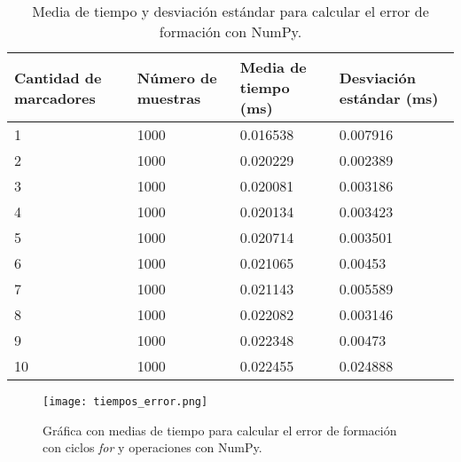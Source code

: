 \begin{table}[H]
	\centering
	\resizebox{\textwidth}{!} {
	\begin{tabular}{|l|l|l|l|}
		\hline
		\textbf{Cantidad de marcadores} & \textbf{Número de muestras} & \textbf{Media de tiempo (ms)} & \textbf{Desviación estándar (ms)} \\ \hline
		1 & 1000 & 0.016538 & 0.007916 \\ \hline
		2 & 1000 & 0.020229 & 0.002389 \\ \hline
		3 & 1000 & 0.020081 & 0.003186 \\ \hline
		4 & 1000 & 0.020134 & 0.003423 \\ \hline
		5 & 1000 & 0.020714 & 0.003501 \\ \hline
		6 & 1000 & 0.021065 & 0.00453 \\ \hline
		7 & 1000 & 0.021143 & 0.005589 \\ \hline
		8 & 1000 & 0.022082 & 0.003146 \\ \hline
		9 & 1000 & 0.022348 & 0.00473 \\ \hline
		10 & 1000 & 0.022455 & 0.024888 \\ \hline
	\end{tabular}}
	\caption{Media de tiempo y desviación estándar para calcular el error de formación con NumPy.}
	\label{cuadro:tiempos_error_numpy}
\end{table}

\begin{figure}[H]
	\centering
	\texttt{[image: tiempos\_error.png]}
	\caption{Gráfica con medias de tiempo para calcular el error de formación con ciclos \textit{for} y operaciones con NumPy.}
	\label{fig:grafica_tiempos_error}
\end{figure}






